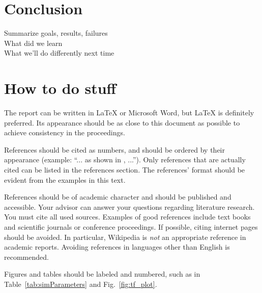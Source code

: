 \documentclass[journal, a4paper]{IEEEtran}
\begin{document}
\section{Conclusion}
Summarize goals, results, failures \\
What did we learn \\ 
What we’ll do differently next time \\

\section{How to do stuff}
    The report can be written in \LaTeX{} or Microsoft Word, but \LaTeX{} is definitely preferred.
    Its appearance should be as close to this document as possible to achieve consistency in the proceedings.

    References should be cited as numbers, and should be ordered by their appearance (example: ``... as shown in \cite{HOP96}, ...'').
    Only references that are actually cited can be listed in the references section.
    The references' format should be evident from the examples in this text.

    References should be of academic character and should be published and accessible.
    Your advisor can answer your questions regarding literature research.
    You must cite all used sources.
    Examples of good references include text books and scientific journals or conference proceedings.
    If possible, citing internet pages should be avoided. In particular, Wikipedia is \emph{not} an appropriate reference in academic reports.
    Avoiding references in languages other than English is recommended.

    Figures and tables should be labeled and numbered, such as in Table~\ref{tab:simParameters} and Fig.~\ref{fig:tf_plot}.
\end{document}
